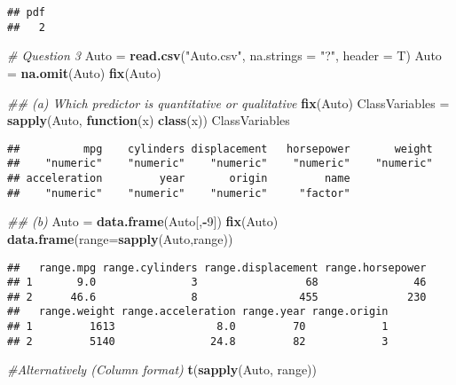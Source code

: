 \documentclass[]{article}
\newenvironment{Shaded}{\begin{snugshade}}{\end{snugshade}}
\newcommand{\CommentTok}[1]{\textcolor[rgb]{0.56,0.35,0.01}{\textit{#1}}}
\newcommand{\ControlFlowTok}[1]{\textcolor[rgb]{0.13,0.29,0.53}{\textbf{#1}}}
\newcommand{\DataTypeTok}[1]{\textcolor[rgb]{0.13,0.29,0.53}{#1}}
\newcommand{\DecValTok}[1]{\textcolor[rgb]{0.00,0.00,0.81}{#1}}
\newcommand{\KeywordTok}[1]{\textcolor[rgb]{0.13,0.29,0.53}{\textbf{#1}}}
\newcommand{\NormalTok}[1]{#1}
\newcommand{\OperatorTok}[1]{\textcolor[rgb]{0.81,0.36,0.00}{\textbf{#1}}}
\newcommand{\StringTok}[1]{\textcolor[rgb]{0.31,0.60,0.02}{#1}}
\begin{document}
\begin{verbatim}
## pdf 
##   2
\end{verbatim}

\begin{Shaded}
\begin{Highlighting}[]
\CommentTok{# Question 3}
\NormalTok{Auto =}\StringTok{ }\KeywordTok{read.csv}\NormalTok{(}\StringTok{"Auto.csv"}\NormalTok{, }\DataTypeTok{na.strings =} \StringTok{"?"}\NormalTok{, }\DataTypeTok{header =}\NormalTok{ T)}
\NormalTok{Auto =}\StringTok{ }\KeywordTok{na.omit}\NormalTok{(Auto)}
\KeywordTok{fix}\NormalTok{(Auto)}

\CommentTok{## (a) Which predictor is quantitative or qualitative}
\KeywordTok{fix}\NormalTok{(Auto)}
\NormalTok{ClassVariables =}\StringTok{ }\KeywordTok{sapply}\NormalTok{(Auto, }\ControlFlowTok{function}\NormalTok{(x) }\KeywordTok{class}\NormalTok{(x))}
\NormalTok{ClassVariables}
\end{Highlighting}
\end{Shaded}

\begin{verbatim}
##          mpg    cylinders displacement   horsepower       weight 
##    "numeric"    "numeric"    "numeric"    "numeric"    "numeric" 
## acceleration         year       origin         name 
##    "numeric"    "numeric"    "numeric"     "factor"
\end{verbatim}

\begin{Shaded}
\begin{Highlighting}[]
\CommentTok{## (b)}
\NormalTok{Auto =}\StringTok{ }\KeywordTok{data.frame}\NormalTok{(Auto[,}\OperatorTok{-}\DecValTok{9}\NormalTok{])}
\KeywordTok{fix}\NormalTok{(Auto)}
\KeywordTok{data.frame}\NormalTok{(}\DataTypeTok{range=}\KeywordTok{sapply}\NormalTok{(Auto,range))}
\end{Highlighting}
\end{Shaded}

\begin{verbatim}
##   range.mpg range.cylinders range.displacement range.horsepower
## 1       9.0               3                 68               46
## 2      46.6               8                455              230
##   range.weight range.acceleration range.year range.origin
## 1         1613                8.0         70            1
## 2         5140               24.8         82            3
\end{verbatim}

\begin{Shaded}
\begin{Highlighting}[]
\CommentTok{#Alternatively (Column format)}
\KeywordTok{t}\NormalTok{(}\KeywordTok{sapply}\NormalTok{(Auto, range))}
\end{Highlighting}
\end{Shaded}
\end{document}
